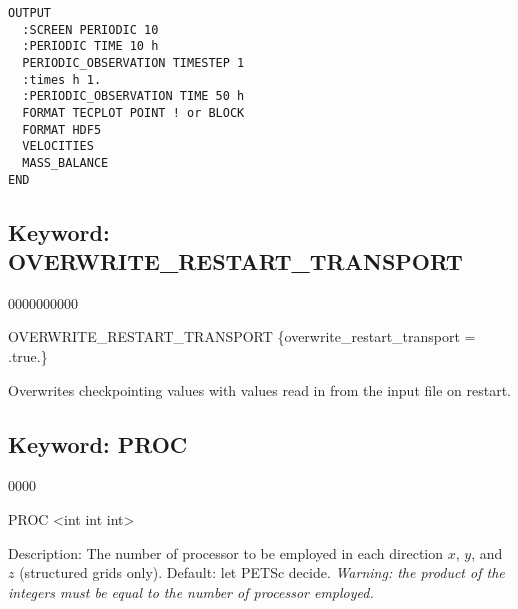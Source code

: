 \begin{mdframed}


\begin{verbatim}
OUTPUT
  :SCREEN PERIODIC 10
  :PERIODIC TIME 10 h
  PERIODIC_OBSERVATION TIMESTEP 1
  :times h 1.
  :PERIODIC_OBSERVATION TIME 50 h
  FORMAT TECPLOT POINT ! or BLOCK
  FORMAT HDF5
  VELOCITIES
  MASS_BALANCE
END
\end{verbatim}
\end{mdframed}

\hyperlink{target_key}{\return}


\newpage
\protect\hypertarget{target_overwrite}{}

\subsection{Keyword: OVERWRITE\_RESTART\_TRANSPORT}
\begin{deflist}{0000000000}
\item[OVERWRITE\_RESTART\_TRANSPORT] \{overwrite\_restart\_transport = .true.\}
\end{deflist}

Overwrites checkpointing values with values read in from the input file on restart.

\hyperlink{target_key}{\return}


\newpage
\protect\hypertarget{target_proc}{}

\subsection{Keyword: PROC}

\begin{deflist}{0000}
\item[PROC] <int int int> 
\item[Description:] The number of processor to be employed in each direction $x$, $y$, and $z$ (structured grids only). Default: let PETSc decide. {\em Warning: the product of the integers must be equal to the number of processor employed.}
\end{deflist}

